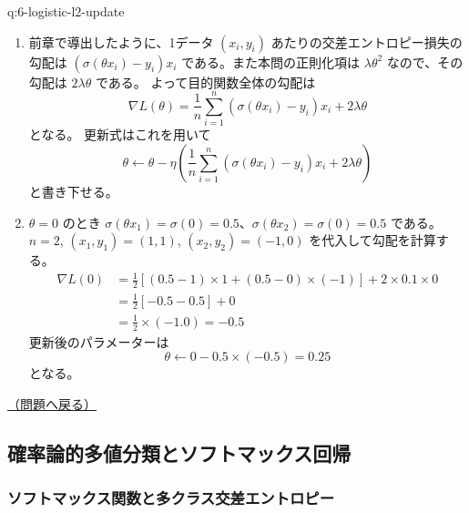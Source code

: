\documentclass[
  pandoc]{bxjsarticle}
\begin{document}
\begin{answerbox}[phantomlabel=a:6-logistic-l2-update]{q:6-logistic-l2-update}

\begin{enumerate}
\def\labelenumi{\arabic{enumi}.}
\item
  前章で導出したように、1データ \((x_i, y_i)\)
  あたりの交差エントロピー損失の勾配は \((\sigma(\theta x_i) - y_i)x_i\)
  である。また本問の正則化項は \(\lambda \theta^2\) なので、その勾配は
  \(2\lambda \theta\) である。 よって目的関数全体の勾配は
  \[ \nabla L(\theta) = \frac{1}{n} \sum_{i=1}^n (\sigma(\theta x_i) - y_i)x_i + 2\lambda \theta \]
  となる。 更新式はこれを用いて
  \[ \theta \leftarrow \theta - \eta \left( \frac{1}{n} \sum_{i=1}^n (\sigma(\theta x_i) - y_i)x_i + 2\lambda \theta \right) \]
  と書き下せる。
\item
  \(\theta = 0\) のとき
  \(\sigma(\theta x_1) = \sigma(0) = 0.5\)、\(\sigma(\theta x_2) = \sigma(0) = 0.5\)
  である。 \(n=2\), \((x_1, y_1) = (1, 1)\), \((x_2, y_2) = (-1, 0)\)
  を代入して勾配を計算する。 \begin{align*}
  \nabla L(0) &= \frac{1}{2} \left[ (0.5 - 1) \times 1 + (0.5 - 0) \times (-1) \right] + 2 \times 0.1 \times 0 \\
  &= \frac{1}{2} \left[ -0.5 - 0.5 \right] + 0 \\
  &= \frac{1}{2} \times (-1.0) = -0.5
  \end{align*} 更新後のパラメーターは
  \[ \theta \leftarrow 0 - 0.5 \times (-0.5) = 0.25 \] となる。
\end{enumerate}

\hfill 

\hyperref[q:6-logistic-l2-update]{（問題へ戻る）}

\end{answerbox}

\subsection{確率論的多値分類とソフトマックス回帰}\label{ux78baux7387ux8ad6ux7684ux591aux5024ux5206ux985eux3068ux30bdux30d5ux30c8ux30deux30c3ux30afux30b9ux56deux5e30-1}

\subsubsection{ソフトマックス関数と多クラス交差エントロピー}\label{ux30bdux30d5ux30c8ux30deux30c3ux30afux30b9ux95a2ux6570ux3068ux591aux30afux30e9ux30b9ux4ea4ux5deeux30a8ux30f3ux30c8ux30edux30d4ux30fc-1}
\end{document}
